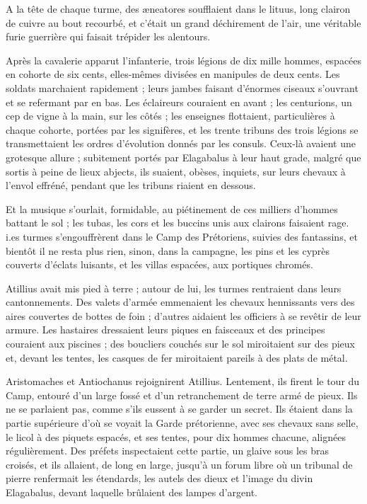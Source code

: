 \documentclass[a4paper, 11pt, oneside, polutonikogreek, french]{article}
\begin{document}
A la tête de chaque turme, des æneatores soufflaient dans le lituus, long clairon de cuivre au bout recourbé, et c'était un grand déchirement de l'air, une véritable furie guerrière qui faisait trépider les alentours.

Après la cavalerie apparut l'infanterie, trois légions de dix mille hommes, espacées en cohorte de six cents, elles-mêmes divisées en manipules de deux cents. Les soldats marchaient rapidement ; leurs jambes faisant d'énormes ciseaux s'ouvrant et se refermant par en bas. Les éclaireurs couraient en avant ; les centurions, un cep de vigne à la main, sur les côtés ; les enseignes flottaient, particulières à chaque cohorte, portées par les signifères, et les trente tribuns des trois légions se transmettaient les ordres d'évolution donnés par les consuls. Ceux-là avaient une grotesque allure ; subitement portés par Elagabalus à leur haut grade, malgré que sortis à peine de lieux abjects, ils suaient, obèses, inquiets, sur leurs chevaux à l'envol effréné, pendant que les tribuns riaient en dessous.

Et la musique s'ourlait, formidable, au piétinement de ces milliers d'hommes battant le sol ; les tubas, les cors et les buccins unis aux clairons faisaient rage. i.es turmes s'engouffrèrent dans le Camp des Prétoriens, suivies des fantassins, et bientôt il ne resta plus rien, sinon, dans la campagne, les pins et les cyprès couverts d'éclats luisants, et les villas espacées, aux portiques chromés.

Atillius avait mis pied à terre ; autour de lui, les turmes rentraient dans leurs cantonnements. Des valets d'armée emmenaient les chevaux hennissants vers des aires couvertes de bottes de foin ; d'autres aidaient les officiers à se revêtir de leur armure. Les hastaires dressaient leurs piques en faisceaux et des principes couraient aux piscines ; des boucliers couchés sur le sol miroitaient sur des pieux et, devant les tentes, les casques de fer miroitaient pareils à des plats de métal.

Aristomaches et Antiochanus rejoignirent Atillius. Lentement, ils firent le tour du Camp, entouré d'un large fossé et d'un retranchement de terre armé de pieux. Ils ne se parlaient pas, comme s'ils eussent à se garder un secret. Ils étaient dans la partie supérieure d'où se voyait la Garde prétorienne, avec ses chevaux sans selle, le licol à des piquets espacés, et ses tentes, pour dix hommes chacune, alignées régulièrement. Des préfets inspectaient cette partie, un glaive sous les bras croisés, et ils allaient, de long en large, jusqu'à un forum libre où un tribunal de pierre renfermait les étendards, les autels des dieux et l'image du divin Elagabalus, devant laquelle brûlaient des lampes d'argent.
\end{document}
